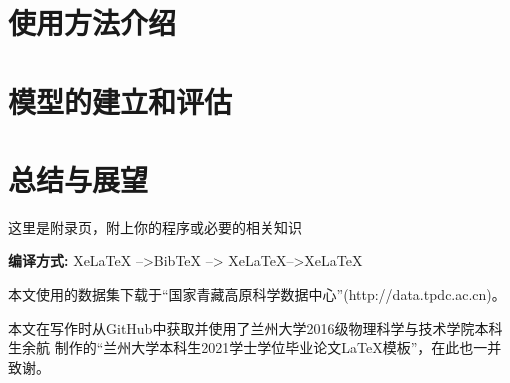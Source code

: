 \documentclass[AutoFakeBold]{LZUThesis}
\begin{document}
\chapter{使用方法介绍}

\chapter{模型的建立和评估}

\chapter{总结与展望}

\backmatter


\printbib


\Appendix


这里是附录页，附上你的程序或必要的相关知识

{\bfseries 编译方式:} XeLaTeX -->BibTeX --> XeLaTeX-->XeLaTeX



\Thanks

本文使用的数据集下载于“国家青藏高原科学数据中心”(http://data.tpdc.ac.cn)。

本文在写作时从GitHub中获取并使用了兰州大学2016级物理科学与技术学院本科生余航
制作的“兰州大学本科生2021学士学位毕业论文LaTeX模板”，在此也一并致谢。
\end{document}
